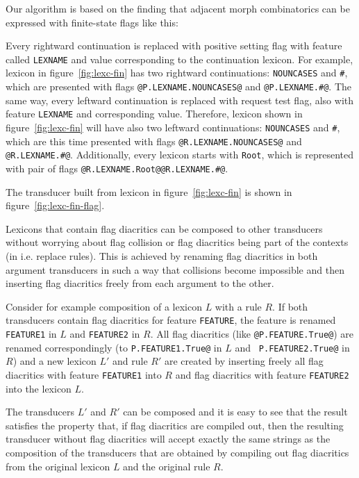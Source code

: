 \documentclass[11pt]{article}
\begin{document}
Our algorithm is based on the finding that adjacent morph combinatorics can be expressed with finite-state flags like this:

Every rightward continuation is replaced with positive setting flag with feature called \texttt{LEXNAME} and value corresponding to the continuation lexicon. For example, lexicon in figure~\ref{fig:lexc-fin} has two rightward continuations: \texttt{NOUNCASES} and \texttt{\#}, which are presented with flags \verb+@P.LEXNAME.NOUNCASES@+ and \verb+@P.LEXNAME.#@+. 
The same way, every leftward continuation is replaced with request test flag, also with feature \texttt{LEXNAME} and corresponding value. Therefore, lexicon shown in figure~\ref{fig:lexc-fin} will have also two leftward continuations: \texttt{NOUNCASES} and \texttt{\#}, which are this time presented with flags \verb+@R.LEXNAME.NOUNCASES@+ and \verb+@R.LEXNAME.#@+. Additionally, every lexicon starts with \texttt{Root}, which is represented with pair of flags \verb+@R.LEXNAME.Root@@R.LEXNAME.#@+.

The transducer built from lexicon in figure~\ref{fig:lexc-fin} is shown in figure~\ref{fig:lexc-fin-flag}. 


Lexicons that contain flag diacritics can be composed to other
transducers without worrying about flag collision or flag diacritics
being part of the contexts (in i.e. replace rules). This is achieved
by renaming flag diacritics in both argument transducers in such a way
that collisions become impossible and then inserting flag diacritics
freely from each argument to the other.

Consider for example composition of a lexicon $L$ with a rule $R$. If
both transducers contain flag diacritics for feature {\tt FEATURE},
the feature is renamed {\tt FEATURE1} in $L$ and {\tt FEATURE2} in
$R$. All flag diacritics (like {\tt @P.FEATURE.True@}) are renamed
correspondingly (to {\tt P.FEATURE1.True@} in $L$ and {\tt
  P.FEATURE2.True@} in $R$) and a new lexicon $L'$ and rule $R'$ are created
by inserting freely all flag diacritics with feature {\tt FEATURE1}
into $R$ and flag diacritics with feature {\tt FEATURE2} into the
lexicon $L$.

The transducers $L'$ and $R'$ can be composed and it is easy to
see that the result satisfies the property that, if flag diacritics
are compiled out, then the resulting transducer without flag
diacritics will accept exactly the same strings as the composition of
the transducers that are obtained by compiling out flag diacritics
from the original lexicon $L$ and the original rule $R$.
\end{document}
